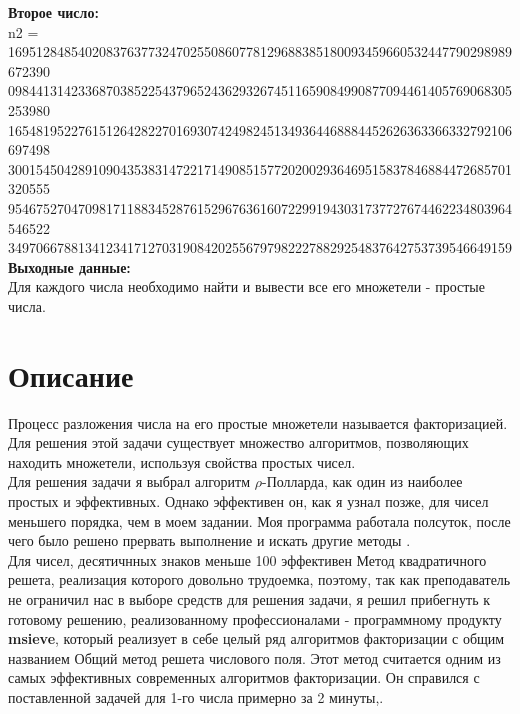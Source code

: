 \documentclass[pdf, unicode, 12pt, a4paper,oneside,fleqn]{article}
\begin{document}
{\bfseries Второе число:} \\

n2 = \\
169512848540208376377324702550860778129688385180093459660532447790298989672390\\
098441314233687038522543796524362932674511659084990877094461405769068305253980\\
165481952276151264282270169307424982451349364468884452626363366332792106697498\\
300154504289109043538314722171490851577202002936469515837846884472685701320555\\
954675270470981711883452876152967636160722991943031737727674462234803964546522\\
349706678813412341712703190842025567979822278829254837642753739546649159 \\

{\bfseries Выходные данные:} \\
Для каждого числа необходимо найти и  вывести все его множетели - простые числа.

\pagebreak

\section{Описание}

Процесс разложения числа на его простые множетели называется факторизацией. Для решения этой задачи существует множество алгоритмов, позволяющих находить множетели, используя свойства простых чисел. \\

Для решения задачи я выбрал алгоритм $\rho$-Полларда{\cite{pol}}, как один из наиболее простых и эффективных. Однако эффективен он, как я узнал позже, для чисел меньшего порядка, чем в моем задании. Моя программа работала полсуток, после чего было решено прервать выполнение и искать другие методы . \\

Для чисел, десятичнных знаков меньше 100 эффективен Метод квадратичного решета, реализация которого довольно трудоемка, поэтому, так как преподаватель не ограничил нас в выборе средств для решения задачи, я решил прибегнуть к готовому решению, реализованному профессионалами - программному продукту {\bfseries msieve}{\cite{msieve}}, который реализует в себе целый ряд алгоритмов факторизации с общим названием Общий метод решета числового поля. Этот метод считается одним из самых эффективных современных алгоритмов факторизации. Он справился с поставленной задачей для 1-го числа примерно за 2 минуты,. \\
\end{document}
